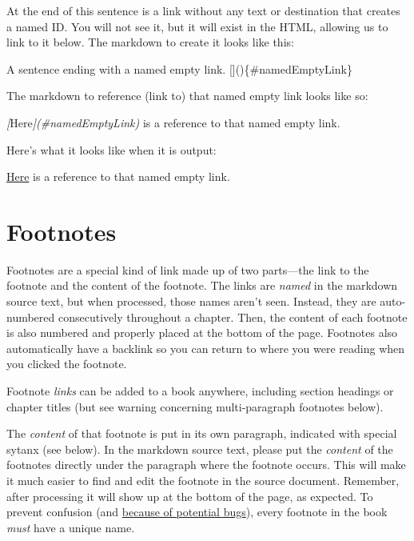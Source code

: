 \documentclass[
]{book}
\newenvironment{Shaded}{\begin{snugshade}}{\end{snugshade}}
\newcommand{\CommentTok}[1]{\textcolor[rgb]{0.56,0.35,0.01}{\textit{#1}}}
\newcommand{\NormalTok}[1]{#1}
\newcommand{\OtherTok}[1]{\textcolor[rgb]{0.56,0.35,0.01}{#1}}
\begin{document}
At the end of this sentence is a link without any text or destination that creates a named ID. \protect\hypertarget{namedEmptyLink}{\href{}{}} You will not see it, but it will exist in the HTML, allowing us to link to it below. The markdown to create it looks like this:

\begin{Shaded}
\begin{Highlighting}[]
\NormalTok{A sentence ending with a named empty link. []()\{\#namedEmptyLink\}}
\end{Highlighting}
\end{Shaded}

The markdown to reference (link to) that named empty link looks like so:

\begin{Shaded}
\begin{Highlighting}[]
\CommentTok{[}\OtherTok{Here}\CommentTok{](\#namedEmptyLink)}\NormalTok{ is a reference to that named empty link. }
\end{Highlighting}
\end{Shaded}

Here's what it looks like when it is output:

\protect\hyperlink{namedEmptyLink}{Here} is a reference to that named empty link.

\hypertarget{footnotes}{%
\section{Footnotes}\label{footnotes}}

Footnotes are a special kind of link made up of two parts---the link to the footnote and the content of the footnote. The links are \emph{named} in the markdown source text, but when processed, those names aren't seen. Instead, they are auto-numbered consecutively throughout a chapter. Then, the content of each footnote is also numbered and properly placed at the bottom of the page. Footnotes also automatically have a backlink so you can return to where you were reading when you clicked the footnote.

Footnote \emph{links} can be added to a book anywhere, including section headings or chapter titles (but see warning concerning multi-paragraph footnotes below).

The \emph{content} of that footnote is put in its own paragraph, indicated with special sytanx (see below). In the markdown source text, please put the \emph{content} of the footnotes directly under the paragraph where the footnote occurs. This will make it much easier to find and edit the footnote in the source document. Remember, after processing it will show up at the bottom of the page, as expected. To prevent confusion (and \href{https://community.rstudio.com/t/how-can-i-enable-the-file-scope-option/83741}{because of potential bugs}), every footnote in the book \emph{must} have a unique name.
\end{document}
